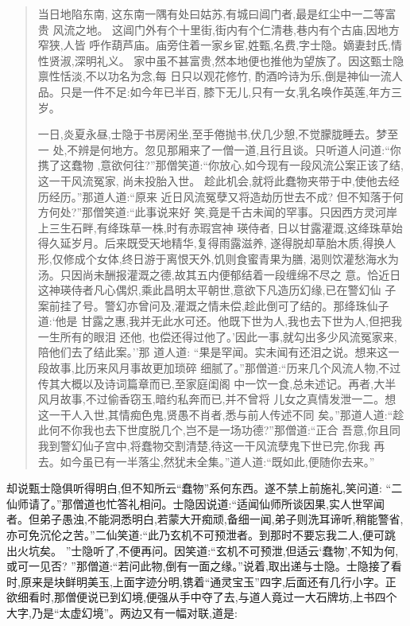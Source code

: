 \documentclass[nofonts]{ctexbook}
\newcommand*{\fs}{\CJKfamily{fangsong}}   %
\begin{document}
\begin{quotation} \fs
    当日地陷东南, 这东南一隅有处曰姑苏,有城曰阊门者,最是红尘中一二等富贵
风流之地。 这阊门外有个十里街,街内有个仁清巷,巷内有个古庙,因地方窄狭,人皆
呼作葫芦庙。庙旁住着一家乡宦,姓甄,名费,字士隐。嫡妻封氏,情性贤淑,深明礼义。
家中虽不甚富贵,然本地便也推他为望族了。因这甄士隐禀性恬淡,不以功名为念,每
日只以观花修竹, 酌酒吟诗为乐,倒是神仙一流人品。只是一件不足:如今年已半百,
膝下无儿,只有一女,乳名唤作英莲,年方三岁。


    一日,炎夏永昼,士隐于书房闲坐,至手倦抛书,伏几少憩,不觉朦胧睡去。梦至一
处,不辨是何地方。忽见那厢来了一僧一道,且行且谈。只听道人问道:``你携了这蠢物
,意欲何往?''那僧笑道:``你放心,如今现有一段风流公案正该了结,这一干风流冤家,
尚未投胎入世。 趁此机会,就将此蠢物夹带于中,使他去经历经历。''那道人道:``原来
近日风流冤孽又将造劫历世去不成? 但不知落于何方何处?''那僧笑道:``此事说来好
笑,竟是千古未闻的罕事。只因西方灵河岸上三生石畔,有绛珠草一株,时有赤瑕宫神
瑛侍者, 日以甘露灌溉,这绛珠草始得久延岁月。后来既受天地精华,复得雨露滋养,
遂得脱却草胎木质,得换人形,仅修成个女体,终日游于离恨天外,饥则食蜜青果为膳,
渴则饮灌愁海水为汤。只因尚未酬报灌溉之德,故其五内便郁结着一段缠绵不尽之
意。恰近日这神瑛侍者凡心偶炽,乘此昌明太平朝世,意欲下凡造历幻缘,已在警幻仙
子案前挂了号。警幻亦曾问及,灌溉之情未偿,趁此倒可了结的。那绛珠仙子道:`他是
甘露之惠,我并无此水可还。他既下世为人,我也去下世为人,但把我一生所有的眼泪
还他, 也偿还得过他了。'因此一事,就勾出多少风流冤家来,陪他们去了结此案。''那
道人道: ``果是罕闻。实未闻有还泪之说。想来这一段故事,比历来风月事故更加琐碎
细腻了。''那僧道:``历来几个风流人物,不过传其大概以及诗词篇章而已,至家庭闺阁
中一饮一食,总未述记。再者,大半风月故事,不过偷香窃玉,暗约私奔而已,并不曾将
儿女之真情发泄一二。想这一干人入世,其情痴色鬼,贤愚不肖者,悉与前人传述不同
矣。''那道人道:``趁此何不你我也去下世度脱几个,岂不是一场功德?''那僧道:``正合
吾意,你且同我到警幻仙子宫中,将蠢物交割清楚,待这一干风流孽鬼下世已完,你我
再去。如今虽已有一半落尘,然犹未全集。''道人道:``既如此,便随你去来。''
\end{quotation}

    却说甄士隐俱听得明白,但不知所云``蠢物''系何东西。遂不禁上前施礼,笑问道:
``二仙师请了。''那僧道也忙答礼相问。士隐因说道:``适闻仙师所谈因果,实人世罕闻
者。但弟子愚浊,不能洞悉明白,若蒙大开痴顽,备细一闻,弟子则洗耳谛听,稍能警省,
亦可免沉伦之苦。''二仙笑道:``此乃玄机不可预泄者。到那时不要忘我二人,便可跳
出火坑矣。 ''士隐听了,不便再问。因笑道:``玄机不可预泄,但适云`蠢物',不知为何,
或可一见否? ''那僧道:``若问此物,倒有一面之缘。''说着,取出递与士隐。士隐接了看
时,原来是块鲜明美玉,上面字迹分明,镌着``通灵宝玉''四字,后面还有几行小字。正
欲细看时,那僧便说已到幻境,便强从手中夺了去,与道人竟过一大石牌坊,上书四个
大字,乃是``太虚幻境''。两边又有一幅对联,道是:
\end{document}
